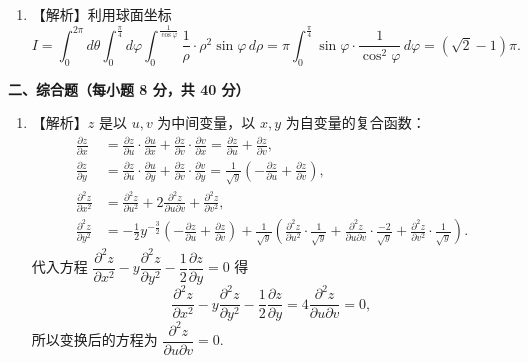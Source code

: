 \documentclass[a4paper,11pt]{ctexart}
\begin{document}
\begin{enumerate}[label=\arabic*、, leftmargin=2.2em, itemsep=0.9em, topsep=0.6em]
  \item 【解析】利用球面坐标
  \[
    I = \int_0^{2\pi} d\theta \int_0^{\frac{\pi}{4}} d\varphi \int_0^{\frac{1}{\cos\varphi}} \frac{1}{\rho}\cdot \rho^2\sin\varphi\,d\rho = \pi \int_0^{\frac{\pi}{4}} \sin\varphi \cdot \frac{1}{\cos^2\varphi}\,d\varphi = (\sqrt{2} - 1)\pi.
  \]
\end{enumerate}

\vspace{0.6em}

\textbf{二、综合题（每小题 8 分，共 40 分）}

\begin{enumerate}[label=\arabic*、, leftmargin=2.2em, itemsep=0.9em, topsep=0.6em]
  \item 【解析】$z$ 是以 $u,v$ 为中间变量，以 $x,y$ 为自变量的复合函数：
  \begin{align*}
    \frac{\partial z}{\partial x} &= \frac{\partial z}{\partial u}\cdot\frac{\partial u}{\partial x} + \frac{\partial z}{\partial v}\cdot\frac{\partial v}{\partial x} = \frac{\partial z}{\partial u} + \frac{\partial z}{\partial v}, \\
    \frac{\partial z}{\partial y} &= \frac{\partial z}{\partial u}\cdot\frac{\partial u}{\partial y} + \frac{\partial z}{\partial v}\cdot\frac{\partial v}{\partial y} = \frac{1}{\sqrt{y}}\left(-\frac{\partial z}{\partial u} + \frac{\partial z}{\partial v}\right), \\
    \frac{\partial^2 z}{\partial x^2} &= \frac{\partial^2 z}{\partial u^2} + 2\frac{\partial^2 z}{\partial u\partial v} + \frac{\partial^2 z}{\partial v^2}, \\
    \frac{\partial^2 z}{\partial y^2} &= -\frac{1}{2}y^{-\frac{3}{2}}\left(-\frac{\partial z}{\partial u} + \frac{\partial z}{\partial v}\right) + \frac{1}{\sqrt{y}}\left(\frac{\partial^2 z}{\partial u^2}\cdot\frac{1}{\sqrt{y}} + \frac{\partial^2 z}{\partial u\partial v}\cdot\frac{-2}{\sqrt{y}} + \frac{\partial^2 z}{\partial v^2}\cdot\frac{1}{\sqrt{y}}\right).
  \end{align*}
  代入方程 $\dfrac{\partial^2 z}{\partial x^2} - y\dfrac{\partial^2 z}{\partial y^2} - \dfrac{1}{2}\dfrac{\partial z}{\partial y} = 0$ 得
  \[
    \frac{\partial^2 z}{\partial x^2} - y\frac{\partial^2 z}{\partial y^2} - \frac{1}{2}\frac{\partial z}{\partial y} = 4\frac{\partial^2 z}{\partial u\partial v} = 0,
  \]
  所以变换后的方程为 $\dfrac{\partial^2 z}{\partial u\partial v} = 0$.


\end{enumerate}
\end{document}
